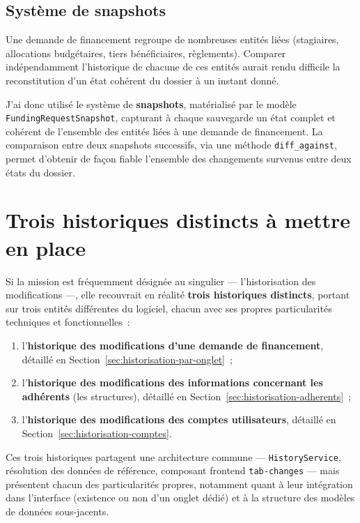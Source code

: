 \subsection{Système de snapshots}

Une demande de financement regroupe de nombreuses entités liées
(stagiaires, allocations budgétaires, tiers bénéficiaires, règlements).
Comparer indépendamment l'historique de chacune de ces entités aurait
rendu difficile la reconstitution d'un état cohérent du dossier à un
instant donné.

J'ai donc utilisé le système de \textbf{snapshots}, matérialisé par
le modèle \texttt{FundingRequestSnapshot}, capturant à chaque sauvegarde
un état complet et cohérent de l'ensemble des entités liées à une demande
de financement. La comparaison entre deux snapshots successifs, via une
méthode \texttt{diff\_against}, permet d'obtenir de façon fiable
l'ensemble des changements survenus entre deux états du dossier.

\section{Trois historiques distincts à mettre en place}
\label{sec:trois-historiques}

Si la mission est fréquemment désignée au singulier — \og{}l'historisation
des modifications\fg{} —, elle recouvrait en réalité \textbf{trois
historiques distincts}, portant sur trois entités différentes du
logiciel, chacun avec ses propres particularités techniques et
fonctionnelles~:

\begin{enumerate}
  \item l'\textbf{historique des modifications d'une demande de
        financement}, détaillé en Section~\ref{sec:historisation-par-onglet}~;
  \item l'\textbf{historique des modifications des informations
        concernant les adhérents} (les structures), détaillé en
        Section~\ref{sec:historisation-adherents}~;
  \item l'\textbf{historique des modifications des comptes
        utilisateurs}, détaillé en Section~\ref{sec:historisation-comptes}.
\end{enumerate}

Ces trois historiques partagent une architecture commune —
\texttt{HistoryService}, résolution des données de référence, composant
frontend \texttt{tab-changes} — mais présentent chacun des particularités
propres, notamment quant à leur intégration dans l'interface (existence
ou non d'un onglet dédié) et à la structure des modèles de données
sous-jacents.

